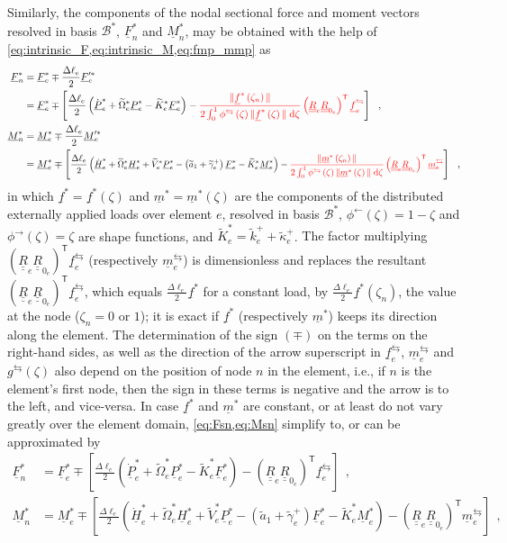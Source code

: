 \documentclass[12pt,a4paper,oneside,english]{abntex2} %
\newcommand{\fix}[1]{{\color{red}#1}}
\newcommand{\vect}[1]{\underline{#1}}
\def\tens#1{\underline{\underline{#1}}}
\def\til#1{\widetilde{#1}}
\def\lb{\left[}
\def\rb{\right]}
\def\lp{\left(}
\def\rp{\right)}
\def\T{\mathsf{T}}
\def\B*{\mathcal{B}^*}
\def\aonetil{\til{a}_1}
\def\R{\tens{R}}
\def\P{\vect{P}}
\def\Ps{\P^*}
\def\Hv{\vect{H}}
\def\Hvs{\Hv^*}
\def\F{\vect{F}}
\def\Fs{\F^*}
\def\M{\vect{M}}
\def\Ms{\M^*}
\def\f{\vect{f}}
\def\fs{\f^*}
\def\m{\vect{m}}
\def\ms{\m^*}
\def\Deltal{\Delta \ell_e}
\def\dlotwo{\frac{\Deltal}{2}}
\def\d{\textnormal{d}}
\def\Vtilse{\til{V}^*_{e}}
\def\Omtilse{\til{\Omega}^*_{e}}
\def\gamptile{\til{\gamma}^{+}_e}
\def\kptile{\til{k}^{+}_e}
\def\kapptile{\til{\kappa}^{+}_e}
\def\Kstile{\til{K}^{*}_e}
\def\Fse{\Fs_e}
\def\Fsep{\vect{F}^{\prime*}_e}
\def\Mse{\Ms_e}
\def\Msep{\vect{M}^{\prime*}_e}
\def\Pse{\Ps_e}
\def\Pdotse{\dot{\P}_e^*}
\def\Hse{\Hvs_e}
\def\Hdotse{\dot{\Hv}_e^*}
\def\fe{\f_e}
\def\me{\m_e}
\def\Re{\R_{e}}
\def\Rze{\R_{0_e}}
\begin{document}
\begin{apendicesenv}
Similarly, the components of the nodal sectional force and moment vectors resolved in basis $\B*$, $\F_n^*$ and $\M_n^*$, may be obtained with the help of \cref{eq:intrinsic_F,eq:intrinsic_M,eq:fmp_mmp} as
\begin{align}
    \F_n^* &= \Fse \mp \dlotwo\Fsep
    \nonumber \\
    &= \Fse \mp \lb \dlotwo\lp\Pdotse+\Omtilse\Pse-\Kstile\Fse\rp - \fix{\frac{\|\fs\lp\zeta_n\rp\|}{2\int_0^1 \phi^\leftrightarrows\lp\zeta\rp\|\fs\lp\zeta\rp\|\;\d\zeta}\lp\Re\Rze\rp^\T \fe^\leftrightarrows} \rb \ \ ,
    \label{eq:Fsn}
    \\
    \M_n^* &= \Mse \mp \dlotwo\Msep
    \nonumber \\
    &= \Mse \mp \lb \scalebox{0.9}{$\displaystyle \dlotwo\lp \Hdotse+\Omtilse\Hse + \Vtilse\Pse-\lp\aonetil+\gamptile\rp\Fse-\Kstile\Mse\rp - 
    \fix{\frac{\|\ms\lp\zeta_n\rp\|}{2\int_0^1 \phi^\leftrightarrows\lp\zeta\rp\|\ms\lp\zeta\rp\|\;\d\zeta}\lp\Re\Rze\rp^\T \me^\leftrightarrows}$} \rb \ \ ,
    \label{eq:Msn} 
\end{align}
in which $\fs = \fs\lp\zeta\rp$ and $\ms = \ms\lp\zeta\rp$ are the components of the distributed externally applied loads over element $e$, resolved in basis $\B*$, $\phi^\leftarrow\lp\zeta\rp = 1-\zeta$ and $\phi^\rightarrow\lp\zeta\rp = \zeta$ are shape functions, and $\Kstile = \kptile + \kapptile$. \fix{The factor multiplying $\lp\Re\Rze\rp^\T\fe^\leftrightarrows$ (respectively $\me^\leftrightarrows$) is dimensionless and replaces the resultant $\lp\Re\Rze\rp^\T\fe^\leftrightarrows$, which equals $\dlotwo\fs$ for a constant load, by $\dlotwo\fs\lp\zeta_n\rp$, the value at the node ($\zeta_n=0$ or $1$); it is exact if $\fs$ (respectively $\ms$) keeps its direction along the element.} The determination of the sign $(\mp)$ on the terms on the right-hand sides, as well as the direction of the arrow superscript in $\fe^\leftrightarrows$, $\me^\leftrightarrows$ and $g^\leftrightarrows\lp\zeta\rp$ also depend on the position of node $n$ in the element, i.e., if $n$ is the element's first node, then the sign in these terms is negative and the arrow is to the left, and vice-versa. In case $\fs$ and $\ms$ are constant, or at least do not vary greatly over the element domain, \cref{eq:Fsn,eq:Msn} simplify to, or can be approximated by
\begin{align}
    \F_n^* &= \Fse \mp \lb \dlotwo\lp\Pdotse+\Omtilse\Pse-\Kstile\Fse\rp - \lp\Re\Rze\rp^\T \fe^\leftrightarrows \rb \ \ ,
    \label{eq:Fsn2}
    \\
    \M_n^* &= \Mse \mp \lb \dlotwo\lp \Hdotse+\Omtilse\Hse + \Vtilse\Pse-\lp\aonetil+\gamptile\rp\Fse-\Kstile\Mse\rp - \lp\Re\Rze\rp^\T\me^\leftrightarrows \rb \ \ ,

\end{align}
\end{apendicesenv}
\end{document}

